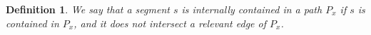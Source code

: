 \documentclass[
submission
]{dmtcs-episciences}
\newtheorem{definition}[theorem]{Definition}
\begin{document}

% 




\begin{definition}
We say that a segment $s$ is \emph{internally contained} in a path $P_{x}$ if $s$ is contained in $P_{x}$, and it does not intersect a relevant edge of $P_{x}$. 
\end{definition}

\end{document}
